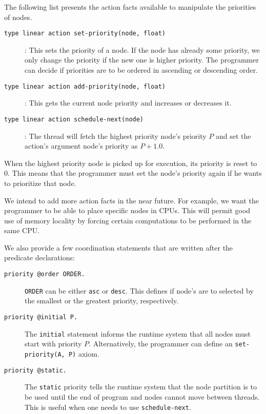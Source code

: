 The following list presents the action facts available to manipulate the priorities of nodes.

\begin{description}
   \item[\texttt{type linear action set-priority(node, float)}]: This sets the priority of a node. If the node has already some priority, we only change the priority if the new one is higher priority. The programmer can decide if priorities are to be ordered in ascending or descending order.
   \item[\texttt{type linear action add-priority(node, float)}]: This gets the current node priority and increases or decreases it.
   \item[\texttt{type linear action schedule-next(node)}]: The thread will fetch the highest priority node's priority $P$ and set the action's argument node's priority as $P + 1.0$.
\end{description}

When the highest priority node is picked up for execution, its priority is reset to 0. This means that
the programmer must set the node's priority again if he wants to prioritize that node.

We intend to add more action facts in the near future. For example, we want the programmer to be able to place specific nodes in CPUs. This will permit good use of
memory locality by forcing certain computations to be performed in the same CPU.

We also provide a few coordination statements that are written after the predicate declarations:

\begin{description}
   \item[\texttt{priority @order ORDER.}] \texttt{ORDER} can be either \texttt{asc} or \texttt{desc}. This defines if node's are to selected by the smallest or the greatest priority, respectively.
   \item[\texttt{priority @initial P.}] The \texttt{initial} statement informs the runtime system that all nodes must start with priority $P$. Alternatively, the programmer can define an \texttt{set-priority(A, P)} axiom.
   \item[\texttt{priority @static.}] The \texttt{static} priority tells the runtime system that the node partition is to be used until the end of program and nodes cannot move between threads. This is useful when one needs to use \texttt{schedule-next}.
\end{description}

